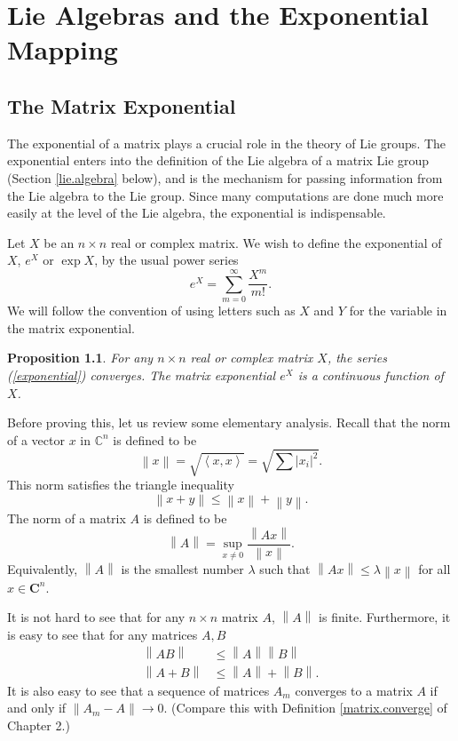 \documentclass{amsbook}
\theoremstyle{plain}
\newtheorem{proposition}[theorem]{Proposition}
\numberwithin{equation}{chapter}
\numberwithin{theorem}{chapter}
\begin{document}
\chapter{Lie Algebras and the Exponential Mapping}

\section{The Matrix Exponential}

The exponential of a matrix plays a crucial role in the theory of Lie groups.
The exponential enters into the definition of the Lie algebra of a matrix Lie
group (Section \ref{lie.algebra} below), and is the mechanism for passing
information from the Lie algebra to the Lie group. Since many computations are
done much more easily at the level of the Lie algebra, the exponential is indispensable.

Let $X$ be an $n\times n$ real or complex matrix. We wish to define the
exponential of $X$, $e^{X}$ or $\exp X$, by the usual power series
\begin{equation}
e^{X}=\sum_{m=0}^{\infty}\frac{X^{m}}{m!}\text{.}\label{exponential}%
\end{equation}
We will follow the convention of using letters such as $X$ and $Y$ for the
variable in the matrix exponential.

\begin{proposition}
\label{convergence}For any $n\times n$ real or complex matrix $X$, the series
(\ref{exponential}) converges. The matrix exponential $e^{X}$ is a continuous
function of $X$.
\end{proposition}

Before proving this, let us review some elementary analysis. Recall that the
norm of a vector $x$ in $\mathbb{C}^{n}$ is defined to be
\[
\left\|  x\right\|  =\sqrt{\left\langle x,x\right\rangle }=\sqrt{\sum\left|
x_{i}\right|  ^{2}}\text{.}%
\]
This norm satisfies the triangle inequality
\[
\left\|  x+y\right\|  \leq\left\|  x\right\|  +\left\|  y\right\|  \text{.}%
\]
The norm of a matrix $A$ is defined to be
\[
\left\|  A\right\|  =\sup_{x\neq0}\frac{\left\|  Ax\right\|  }{\left\|
x\right\|  }\text{.}%
\]
Equivalently, $\left\|  A\right\|  $ is the smallest number $\lambda$ such
that $\left\|  Ax\right\|  \leq\lambda\left\|  x\right\|  $ for all
$x\in\mathbf{C}^{n}$.

It is not hard to see that for any $n\times n$ matrix $A$, $\left\|
A\right\|  $ is finite. Furthermore, it is easy to see that for any matrices
$A,B$%
\begin{align}
\left\|  AB\right\|   & \leq\left\|  A\right\|  \left\|  B\right\|
\label{banach}\\
\left\|  A+B\right\|   & \leq\left\|  A\right\|  +\left\|  B\right\|  \text{.}%
\end{align}
It is also easy to see that a sequence of matrices $A_{m}$ converges to a
matrix $A$ if and only if $\left\|  A_{m}-A\right\|  \rightarrow0$. (Compare
this with Definition \ref{matrix.converge} of Chapter 2.)
\end{document}
